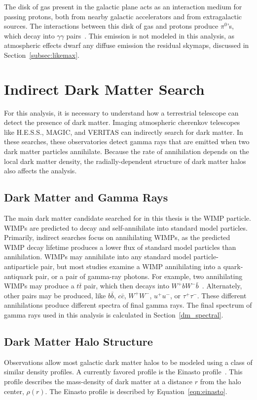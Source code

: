   The disk of gas present in the galactic plane acts as an interaction medium for passing protons, both from nearby galactic accelerators and from extragalactic sources.
  The interactions between this disk of gas and protons produce $\pi^0$'s, which decay into $\gamma\gamma$ pairs~\cite{hess_gc_diffuse}.
  This emission is not modeled in this analysis, as atmospheric effects dwarf any diffuse emission the residual skymaps, discussed in Section~\ref{subsec:likemax}.


\section{Indirect Dark Matter Search}
  For this analysis, it is necessary to understand how a terrestrial telescope can detect the presence of dark matter.
  Imaging atmospheric cherenkov telescopes like H.E.S.S., MAGIC, and VERITAS can indirectly search for dark matter.
  In these searches, these observatories detect gamma rays that are emitted when two dark matter particles annihilate.
  Because the rate of annihilation depends on the local dark matter density, the radially-dependent structure of dark matter halos also affects the analysis.

  \subsection{Dark Matter and Gamma Rays}
    The main dark matter candidate searched for in this thesis is the WIMP particle.
    WIMPs are predicted to decay and self-annihilate into standard model particles.
    Primarily, indirect searches focus on annihilating WIMPs, as the predicted WIMP decay lifetime produces a lower flux of standard model particles than annihilation.
    WIMPs may annihilate into any standard model particle-antiparticle pair, but most studies examine a WIMP annihilating into a quark-antiquark pair, or a pair of gamma-ray photons.
    For example, two annihilating WIMPs may produce a $t\bar{t}$ pair, which then decays into $W^+bW^-\bar{b}$~\cite{pdg2016}.
    Alternately, other pairs may be produced, like  $b\bar{b}$, $c\bar{c}$, $W^+W^-$, $u^+u^-$, or $\tau^+\tau^-$.
    These different annihilations produce different spectra of final gamma rays.
    The final spectrum of gamma rays used in this analysis is calculated in Section~\ref{dm_spectral}.
  
  \subsection{Dark Matter Halo Structure}\label{dm_spatial}
    Observations allow most galactic dark matter halos to be modeled using a class of similar density profiles.
    A currently favored profile is the Einasto profile~\cite{einastoprofile1,einastoprofile2}.
    This profile describes the mass-density of dark matter at a distance $r$ from the halo center, $\rho(r)$.
    The Einasto profile is described by Equation~\ref{eqn:einasto}.

